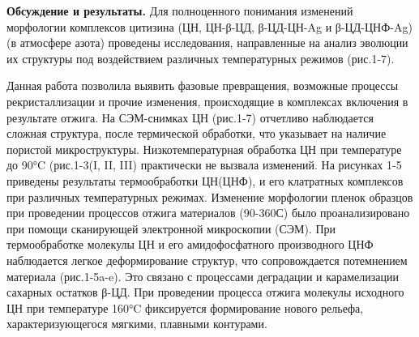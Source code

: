 \begin{multicols}{2}
{\bfseries Обсуждение и результаты.} Для полноценного понимания изменений
морфологии комплексов цитизина (ЦН, ЦН-β-ЦД, β-ЦД-ЦН-Ag и β-ЦД-ЦНФ-Ag)
(в атмосфере азота) проведены исследования, направленные на анализ
эволюции их структуры под воздействием различных температурных режимов
(рис.1-7).

Данная работа позволила выявить фазовые превращения, возможные процессы
рекристаллизации и прочие изменения, происходящие в комплексах включения
в результате отжига. На СЭМ-снимках ЦН (рис.1-7) отчетливо наблюдается
сложная структура, после термической обработки, что указывает на наличие
пористой микроструктуры. Низкотемпературная обработка ЦН при температуре
до 90°C (рис.1-3(I, II, III) практически не вызвала изменений. На
рисунках 1-5 приведены результаты термообработки ЦН(ЦНФ), и его
клатратных комплексов при различных температурных режимах.
Изменение морфологии пленок образцов при проведении процессов отжига
материалов (90-360С) было проанализировано при помощи
сканирующей электронной микроскопии (СЭМ). При термообработке молекулы
ЦН и его амидофосфатного производного ЦНФ наблюдается легкое
деформирование структур, что сопровождается потемнением материала
(рис.1-5a-e). Это связано с процессами деградации и карамелизации
сахарных остатков β-ЦД. При проведении процесса отжига молекулы
исходного ЦН при температуре 160°C фиксируется формирование нового
рельефа, характеризующегося мягкими, плавными контурами.
\end{multicols}





